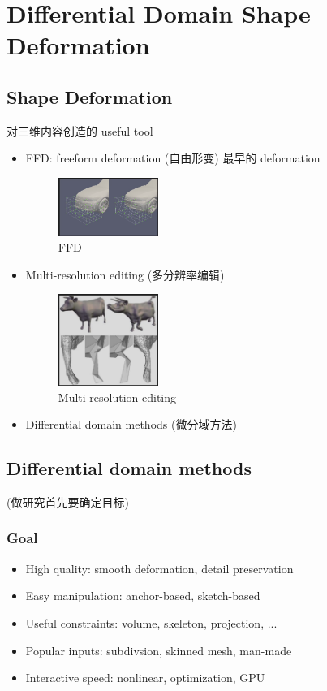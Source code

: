 \newpage
\section{Differential Domain Shape Deformation}

\subsection{Shape Deformation}
对三维内容创造的 useful tool

\begin{itemize}
    \item FFD: freeform deformation (自由形变)
    \subitem 最早的 deformation
    \begin{figure}[!htb]
        \centering
        \includegraphics[width=0.309\textwidth]{pic/ACG6/FFD.png}
        \caption{FFD}
    \end{figure}
    \item Multi-resolution editing (多分辨率编辑)
    \begin{figure}[!htb]
        \centering
        \includegraphics[width=0.309\textwidth]{pic/ACG6/Multi-resolution editing}
        \caption{Multi-resolution editing}
    \end{figure}
    \item Differential domain methods (微分域方法)
\end{itemize}

\subsection{Differential domain methods}
(做研究首先要确定目标)

\subsubsection{Goal}
\begin{itemize}
    \item High quality: smooth deformation, detail preservation 
    \item Easy manipulation: anchor-based, sketch-based
    \item Useful constraints: volume, skeleton, projection, ...
    \item Popular inputs: subdivsion, skinned mesh, man-made
    \item Interactive speed: nonlinear, optimization, GPU
\end{itemize}

